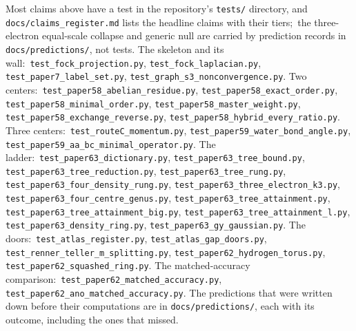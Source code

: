 \documentclass[aps,pra,twocolumn,superscriptaddress,longbibliography]{revtex4-2}
\begin{document}
Most claims above have a test in the repository's \texttt{tests/}
directory, and \texttt{docs/claims\_register.md} lists the headline
claims with their tiers;\ the three-electron equal-scale collapse and
generic null are carried by prediction records in
\texttt{docs/predictions/}, not tests.  The skeleton and its wall:\
\texttt{test\_fock\_projection.py}, \texttt{test\_fock\_laplacian.py},
\texttt{test\_paper7\_label\_set.py},
\texttt{test\_graph\_s3\_nonconvergence.py}.  Two centers:\
\texttt{test\_paper58\_abelian\_residue.py},
\texttt{test\_paper58\_exact\_order.py},
\texttt{test\_paper58\_minimal\_order.py},
\texttt{test\_paper58\_master\_weight.py},
\texttt{test\_paper58\_exchange\_reverse.py},
\texttt{test\_paper58\_hybrid\_every\_ratio.py}.  Three centers:\
\texttt{test\_routeC\_momentum.py},
\texttt{test\_paper59\_water\_bond\_angle.py},
\texttt{test\_paper59\_aa\_bc\_minimal\_operator.py}.  The ladder:\
\texttt{test\_paper63\_dictionary.py},
\texttt{test\_paper63\_tree\_bound.py},
\texttt{test\_paper63\_tree\_reduction.py},
\texttt{test\_paper63\_tree\_rung.py},
\texttt{test\_paper63\_four\_density\_rung.py},
\texttt{test\_paper63\_three\_electron\_k3.py},
\texttt{test\_paper63\_four\_centre\_genus.py},
\texttt{test\_paper63\_tree\_attainment.py},
\texttt{test\_paper63\_tree\_attainment\_big.py},
\texttt{test\_paper63\_tree\_attainment\_l.py},
\texttt{test\_paper63\_density\_ring.py},
\texttt{test\_paper63\_gy\_gaussian.py}.  The doors:\
\texttt{test\_atlas\_register.py},
\texttt{test\_atlas\_gap\_doors.py},
\texttt{test\_renner\_teller\_m\_splitting.py},
\texttt{test\_paper62\_hydrogen\_torus.py},
\texttt{test\_paper62\_squashed\_ring.py}.  The matched-accuracy
comparison:\ \texttt{test\_paper62\_matched\_accuracy.py},
\texttt{test\_paper62\_ano\_matched\_accuracy.py}.  The predictions that
were written down before their computations are in
\texttt{docs/predictions/}, each with its outcome, including the ones
that missed.
\end{document}
